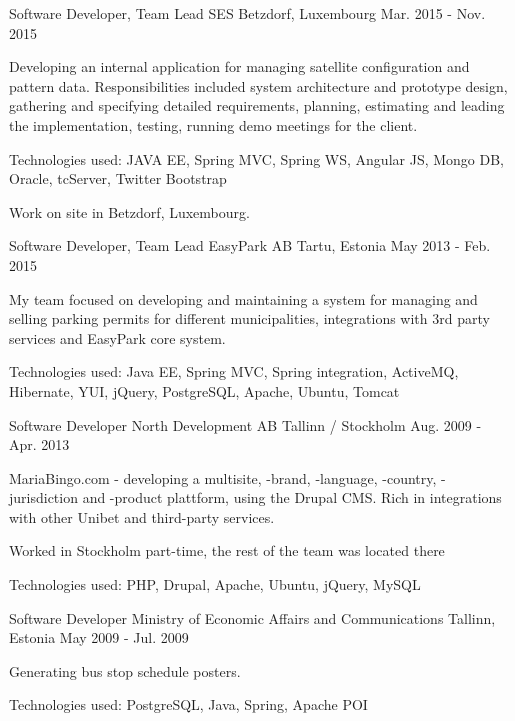 \begin{cventries}
  \cventry
    {Software Developer, Team Lead}
    {SES}
    {Betzdorf, Luxembourg}
    {Mar. 2015 - Nov. 2015}
    {
      \begin{cvitems}
        \item {Developing an internal application for managing satellite configuration and pattern data. Responsibilities included system architecture and prototype design, gathering and specifying detailed requirements, planning, estimating and leading the implementation, testing, running demo meetings for the client.}
        \item { Technologies used: JAVA EE, Spring MVC, Spring WS, Angular JS, Mongo DB, Oracle, tcServer, Twitter Bootstrap }
        \item { Work on site in Betzdorf, Luxembourg. }
      \end{cvitems}
    }

  \cventry
    {Software Developer, Team Lead}
    {EasyPark AB}
    {Tartu, Estonia}
    {May 2013 - Feb. 2015}
    {
      \begin{cvitems}
        \item {My team focused on developing and maintaining a system for managing and selling parking permits for different municipalities, integrations with 3rd party services and EasyPark core system.}
        \item {Technologies used: Java EE, Spring MVC, Spring integration, ActiveMQ, Hibernate, YUI, jQuery, PostgreSQL, Apache, Ubuntu, Tomcat }
      \end{cvitems}
    }

  \cventry
    {Software Developer}
    {North Development AB}
    {Tallinn / Stockholm}
    {Aug. 2009 - Apr. 2013}
    {
      \begin{cvitems}
        \item {MariaBingo.com - developing a multisite, -brand, -language, -country, -jurisdiction and -product plattform, using the Drupal CMS. Rich in integrations with other Unibet and third-party services.}
        \item {Worked in Stockholm part-time, the rest of the team was located there}
        \item { Technologies used: PHP, Drupal, Apache, Ubuntu, jQuery, MySQL }
      \end{cvitems}
    }

  \cventry
    {Software Developer}
    {Ministry of Economic Affairs and Communications}
    {Tallinn, Estonia}
    {May 2009 - Jul. 2009}
    {
      \begin{cvitems}
        \item { Generating bus stop schedule posters.}
        \item { Technologies used: PostgreSQL, Java, Spring, Apache POI }
      \end{cvitems}
    }


\end{cventries}
